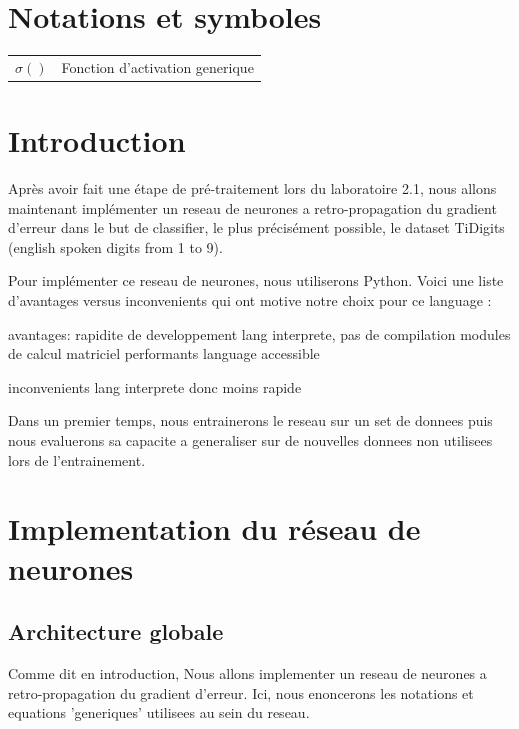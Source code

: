 \documentclass[11pt]{article}
\date{}
\begin{document}
\def \ETScourse {ELE778-01 - Intelligence artificielle: réseaux neuroniques
et systèmes experts}
\def \ETStitle {Laboratoire 2}
\def \ETSprof  {Cynthia \textsc{Moussa}}
\def \ETSauthA {Liam \textsc{Beguin}\\\emph{BEGL02129304}}
\def \ETSauthB {Louis \textsc{Laporte}\\\emph{LAPL14128903}}



\section{Notations et symboles}
\begin{tabular}{p{1.75cm}p{10cm}}
$\sigma()$ & Fonction d'activation generique \\
\end{tabular}
\newpage



\section{Introduction}
Après avoir fait une étape de pré-traitement lors du laboratoire 2.1, nous
allons maintenant implémenter un reseau de neurones a retro-propagation du
gradient d’erreur dans le but de classifier, le plus précisément possible,
le dataset TiDigits (english spoken digits from 1 to 9).

Pour implémenter ce reseau de neurones, nous utiliserons Python.
Voici une liste d'avantages versus inconvenients qui ont motive notre choix
pour ce language :
\begin{itemize*}
\item avantages:
	\subitem rapidite de developpement
		\subitem lang interprete, pas de compilation
		\subitem modules de calcul matriciel performants
		\subitem language accessible
	\item{inconvenients}
		\subitem lang interprete donc moins rapide \\
\end{itemize*}

Dans un premier temps, nous entrainerons le reseau sur un set de donnees puis
nous evaluerons sa capacite a generaliser sur de nouvelles donnees non utilisees
lors de l'entrainement.

\section{Implementation du r\'eseau de neurones}
\subsection{Architecture globale}
Comme dit en introduction, Nous allons implementer un reseau de neurones a
retro-propagation du gradient d'erreur. Ici, nous enoncerons les notations et
equations 'generiques' utilisees au sein du reseau.
\end{document}
